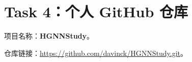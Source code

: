 
\section*{Task 4：个人 GitHub 仓库}
项目名称：\textbf{HGNNStudy}。\par
仓库链接：\underline{\hspace{1cm}https://github.com/davinck/HGNNStudy.git\hspace{1cm}}。\par

